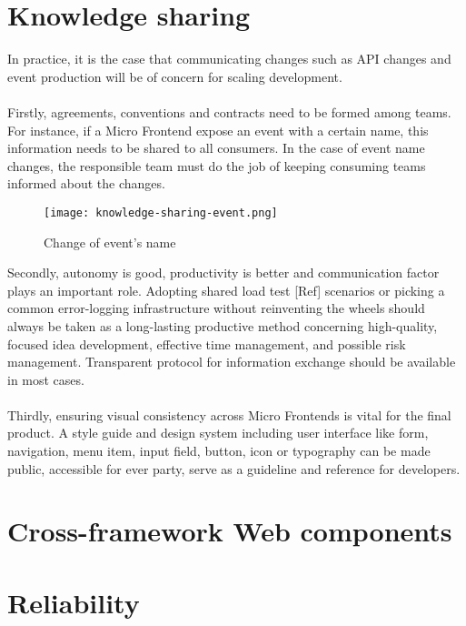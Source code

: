 \documentclass[a4paper]{book}
\begin{document}
\section{Knowledge sharing }
In practice, it is the case that communicating changes such as API changes and event production will be of concern for scaling development. 
\\ \\
Firstly, agreements, conventions and contracts need to be formed among teams. For instance, if a Micro Frontend expose an event with a certain name, this information needs to be shared to all consumers. In the case of event name changes, the responsible team must do the job of keeping consuming teams informed about the changes.
\begin{figure}[h!]
    \centering
    \captionsetup{justification=centering}
    \texttt{[image: knowledge-sharing-event.png]}
    \caption{Change of event's name}
    \label{fig:5}
\end{figure}
Secondly, autonomy is good, productivity is better and communication factor plays an important role. Adopting shared load test [Ref] scenarios or picking a common error-logging infrastructure without reinventing the wheels should always be taken as a long-lasting productive method concerning high-quality, focused idea development, effective time management, and possible risk management. Transparent protocol for information exchange should be available in most cases.
\\ \\
Thirdly, ensuring visual consistency across Micro Frontends is vital for the final product. A style guide and design system including user interface like form, navigation, menu item, input field, button, icon or typography can be made public, accessible for ever party, serve as a guideline and reference for developers.

\section{Cross-framework Web components}

\section{Reliability}
\end{document}
